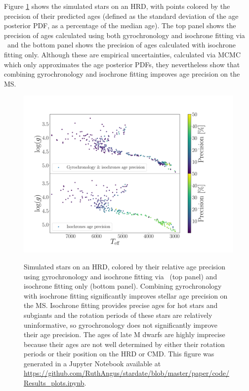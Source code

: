 Figure \ref{fig:precision} shows the simulated stars on an HRD, with
points colored by the precision of their predicted ages
(defined as the standard deviation of the age
posterior PDF, as a percentage of the median age).
The top panel shows the precision of ages calculated using both gyrochronology
and isochrone fitting via \sd\ and the bottom panel shows the precision of
ages calculated with isochrone fitting only.
Although these are empirical uncertainties, calculated via MCMC which only
approximates the age posterior PDFs, they nevertheless show that combining
gyrochronology and isochrone fitting improves age precision on the MS.
\begin{figure}
  \caption{
Simulated stars on an HRD, colored by their relative age precision
    using gyrochronology and isochrone fitting via \sd\ (top panel) and
    isochrone fitting only (bottom panel).
Combining gyrochronology with isochrone fitting significantly improves stellar
    age precision on the MS.
Isochrone fitting provides precise ages for hot stars and subgiants and the
    rotation periods of these stars are relatively uninformative, so
    gyrochronology does not significantly improve their age precision.
The ages of late M dwarfs are highly imprecise because their ages are not well
    determined by either their rotation periods or their position on the HRD
    or CMD.
    This figure was generated in a Jupyter Notebook available at
    \url{https://github.com/RuthAngus/stardate/blob/master/paper/code/Results_plots.ipynb}.
}
  \centering
    \includegraphics[width=1\textwidth]{precision_plot}
\label{fig:precision}
\end{figure}

